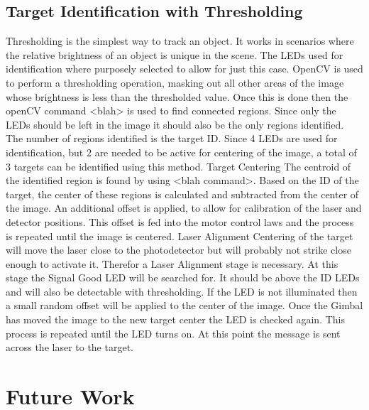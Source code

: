 \documentclass[botnum, fleqn]{unmeethesis}
\begin{document}
\subsection*{Target Identification with Thresholding}
Thresholding is the simplest way to track an object. It works in scenarios where the relative brightness of an object is unique in the scene. The LEDs used for identification where purposely selected to allow for just this case. OpenCV is used to perform a thresholding operation, masking out all other areas of the image whose brightness is less than the thresholded value. Once this is done then the openCV command <blah> is used to find connected regions. Since only the LEDs should be left in the image it should also be the only regions identified. The number of regions identified is the target ID. Since 4 LEDs are used for identification, but 2 are needed to be active for centering of the image, a total of 3 targets can be identified using this method.
Target Centering
The centroid of the identified region is found by using <blah command>. Based on the ID of the target, the center of these regions is calculated and subtracted from the center of the image. An additional offset is applied, to allow for calibration of the laser and detector positions. This offset is fed into the motor control laws and the process is repeated until the image is centered.
Laser Alignment
Centering of the target will move the laser close to the photodetector but will probably not strike close enough to activate it. Therefor a Laser Alignment stage is necessary. At this stage the Signal Good LED will be searched for. It should be above the ID LEDs and will also be detectable with thresholding. If the LED is not illuminated then a small random offset will be applied to the center of the image. Once the Gimbal has moved the image to the new target center the LED is checked again. This process is repeated until the LED turns on.  At this point the message is sent across the laser to the target.



\section*{Future Work} \label{sec:Future Work}




\end{document}
